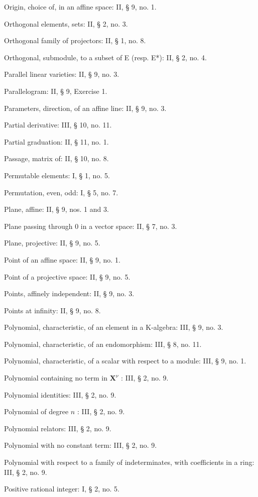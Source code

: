 Origin, choice of, in an affine space: II, § 9, no. 1.

Orthogonal elements, sets: II, § 2, no. 3.

Orthogonal family of projectors: II, § 1, no. 8.

Orthogonal, submodule, to a subset of E (resp. E*): II, § 2, no. 4.

Parallel linear varieties: II, § 9, no. 3.

Parallelogram: II, § 9, Exercise 1.

Parameters, direction, of an affine line: II, § 9, no. 3.

Partial derivative: III, § 10, no. 11.

Partial graduation: II, § 11, no. 1.

Passage, matrix of: II, § 10, no. 8.

Permutable elements: I, § 1, no. 5.

Permutation, even, odd: I, § 5, no. 7.

Plane, affine: II, § 9, nos. 1 and 3.

Plane passing through 0 in a vector space: II, § 7, no. 3.

Plane, projective: II, § 9, no. 5.

Point of an affine space: II, § 9, no. 1.

Point of a projective space: II, § 9, no. 5.

Points, affinely independent: II, § 9, no. 3.

Points at infinity: II, § 9, no. 8.

Polynomial, characteristic, of an element in a K-algebra: III, § 9, no. 3.

Polynomial, characteristic, of an endomorphism: III, § 8, no. 11.

Polynomial, characteristic, of a scalar with respect to a module: III, § 9, no. 1.

Polynomial containing no term in \(\mathbf{X}^{\nu}\) : III, § 2, no. 9.

Polynomial identities: III, § 2, no. 9.

Polynomial of degree \(n\) : III, § 2, no. 9.

Polynomial relators: III, § 2, no. 9.

Polynomial with no constant term: III, § 2, no. 9.

Polynomial with respect to a family of indeterminates, with coefficients in a ring: III, § 2, no. 9.

Positive rational integer: I, § 2, no. 5.

